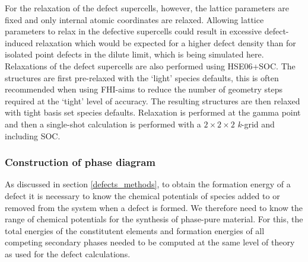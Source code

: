 \documentclass[11pt, twoside]{report}
\begin{document}
For the relaxation of the defect supercells, however, the lattice parameters are fixed and only internal atomic coordinates are relaxed. Allowing lattice parameters to relax in the defective supercells could result in excessive defect-induced relaxation which would be expected for a higher defect density than for isolated point defects in the dilute limit, which is being simulated here. Relaxations of the defect supercells are also performed using HSE06+SOC. The structures are first pre-relaxed with the `light' species defaults, this is often recommended when using FHI-aims to reduce the number of geometry steps required at the `tight' level of accuracy. The resulting structures are then relaxed with tight basis set species defaults. Relaxation is performed at the gamma point and then a single-shot calculation is performed with a $2\times2\times2$ \textit{k}-grid and including SOC.





\subsubsection{Construction of phase diagram}
As discussed in section \ref{defects_methods}, to obtain the formation energy of a defect it is necessary to know the chemical potentials of species added to or removed from the system when a defect is formed. We therefore need to know the range of chemical potentials for the synthesis of phase-pure material. For this, the total energies of the constitutent elements and formation energies of all competing secondary phases needed to be computed at the same level of theory as used for the defect calculations.
\end{document}
